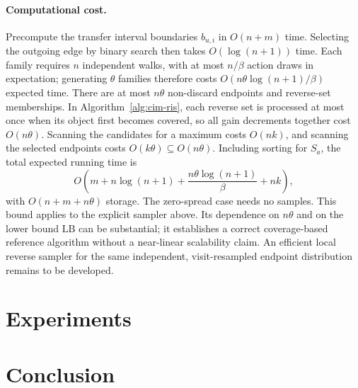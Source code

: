 \documentclass[sigconf]{acmart}
\begin{document}
\paragraph{Computational cost.}
Precompute the transfer interval boundaries $b_{u,i}$ in $O(n+m)$
time. Selecting the outgoing edge by binary search then takes
$O(\log(n+1))$ time. Each family requires $n$ independent walks,
with at most $n/\beta$ action draws in expectation; generating
$\theta$ families therefore costs
$O(n\theta\log(n+1)/\beta)$ expected time.
There are at most $n\theta$ non-discard endpoints and reverse-set
memberships. In Algorithm~\ref{alg:cim-ris}, each reverse set is
processed at most once when its object first becomes covered, so all
gain decrements together cost $O(n\theta)$. Scanning the candidates
for a maximum costs $O(nk)$, and scanning the selected endpoints
costs $O(k\theta)\subseteq O(n\theta)$.
Including sorting for $S_a$, the total expected running time is
\[
  O\!\left(m+n\log(n+1)
       +\frac{n\theta\log(n+1)}{\beta}+nk\right),
\]
with $O(n+m+n\theta)$ storage. The zero-spread case needs no samples.
This bound applies to the explicit sampler above. Its dependence on
$n\theta$ and on the lower bound $\mathrm{LB}$ can be substantial; it establishes
a correct coverage-based reference algorithm without a near-linear
scalability claim. An efficient local reverse sampler for the same
independent, visit-resampled endpoint distribution remains to be developed.



\section{Experiments}
\label{sec:exp}


\section{Conclusion}
\label{sec:conclusion}
\end{document}
